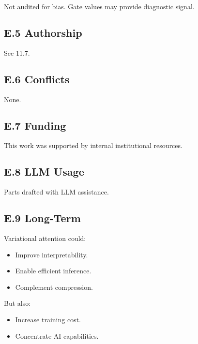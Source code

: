 Not audited for bias. Gate values may provide diagnostic signal.

\subsection{E.5 Authorship}

See  11.7.

\subsection{E.6 Conflicts}

None.

\subsection{E.7 Funding}

This work was supported by internal institutional resources.

\subsection{E.8 LLM Usage}

Parts drafted with LLM assistance.

\subsection{E.9 Long-Term}

Variational attention could:
\begin{itemize}
\item Improve interpretability.
\item Enable efficient inference.
\item Complement compression.

\end{itemize}
But also:
\begin{itemize}
\item Increase training cost.
\item Concentrate AI capabilities.

\end{itemize}
